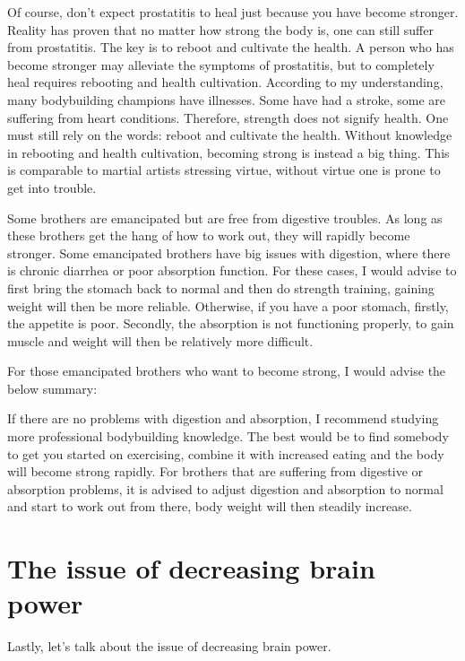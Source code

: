 \documentclass[
]{book}
\begin{document}
Of course, don't expect prostatitis to heal just because you have become stronger. Reality has proven that no matter how strong the body is, one can still suffer from prostatitis. The key is to reboot and cultivate the health. A person who has become stronger may alleviate the symptoms of prostatitis, but to completely heal requires rebooting and health cultivation. According to my understanding, many bodybuilding champions have illnesses. Some have had a stroke, some are suffering from heart conditions. Therefore, strength does not signify health. One must still rely on the words: reboot and cultivate the health. Without knowledge in rebooting and health cultivation, becoming strong is instead a big thing. This is comparable to martial artists stressing virtue, without virtue one is prone to get into trouble.

Some brothers are emancipated but are free from digestive troubles. As long as these brothers get the hang of how to work out, they will rapidly become stronger. Some emancipated brothers have big issues with digestion, where there is chronic diarrhea or poor absorption function. For these cases, I would advise to first bring the stomach back to normal and then do strength training, gaining weight will then be more reliable. Otherwise, if you have a poor stomach, firstly, the appetite is poor. Secondly, the absorption is not functioning properly, to gain muscle and weight will then be relatively more difficult.

For those emancipated brothers who want to become strong, I would advise the below summary:

If there are no problems with digestion and absorption, I recommend studying more professional bodybuilding knowledge. The best would be to find somebody to get you started on exercising, combine it with increased eating and the body will become strong rapidly.
For brothers that are suffering from digestive or absorption problems, it is advised to adjust digestion and absorption to normal and start to work out from there, body weight will then steadily increase.

\hypertarget{the-issue-of-decreasing-brain-power}{%
\section{The issue of decreasing brain power}\label{the-issue-of-decreasing-brain-power}}

Lastly, let's talk about the issue of decreasing brain power.
\end{document}
